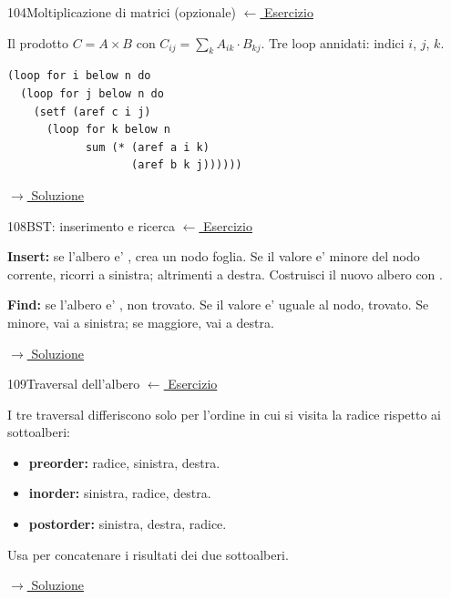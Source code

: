 \label{hint:104}
\begin{hintbox}{104}{Moltiplicazione di matrici (opzionale)}
\small\color{black!55}\hyperref[ex:104]{$\leftarrow$ Esercizio}\normalsize\color{black}

Il prodotto $C = A \times B$ con $C_{ij} = \sum_k A_{ik} \cdot B_{kj}$.
Tre loop annidati: indici $i$, $j$, $k$.
\begin{lstlisting}
(loop for i below n do
  (loop for j below n do
    (setf (aref c i j)
      (loop for k below n
            sum (* (aref a i k)
                   (aref b k j))))))
\end{lstlisting}

\small\color{black!55}\hyperref[sol:104]{$\rightarrow$ Soluzione}\normalsize\color{black}
\end{hintbox}

\label{hint:108}
\begin{hintbox}{108}{BST: inserimento e ricerca}
\small\color{black!55}\hyperref[ex:108]{$\leftarrow$ Esercizio}\normalsize\color{black}

\textbf{Insert:} se l'albero e' , crea un nodo foglia.
Se il valore e' minore del nodo corrente, ricorri a sinistra;
altrimenti a destra. Costruisci il nuovo albero con .

\textbf{Find:} se l'albero e' , non trovato.
Se il valore e' uguale al nodo, trovato.
Se minore, vai a sinistra; se maggiore, vai a destra.

\small\color{black!55}\hyperref[sol:108]{$\rightarrow$ Soluzione}\normalsize\color{black}
\end{hintbox}

\label{hint:109}
\begin{hintbox}{109}{Traversal dell'albero}
\small\color{black!55}\hyperref[ex:109]{$\leftarrow$ Esercizio}\normalsize\color{black}

I tre traversal differiscono solo per l'ordine in cui si
visita la radice rispetto ai sottoalberi:
\begin{itemize}[leftmargin=2em]
  \item \textbf{preorder:} radice, sinistra, destra.
  \item \textbf{inorder:} sinistra, radice, destra.
  \item \textbf{postorder:} sinistra, destra, radice.
\end{itemize}
Usa  per concatenare i risultati dei due sottoalberi.

\small\color{black!55}\hyperref[sol:109]{$\rightarrow$ Soluzione}\normalsize\color{black}
\end{hintbox}

